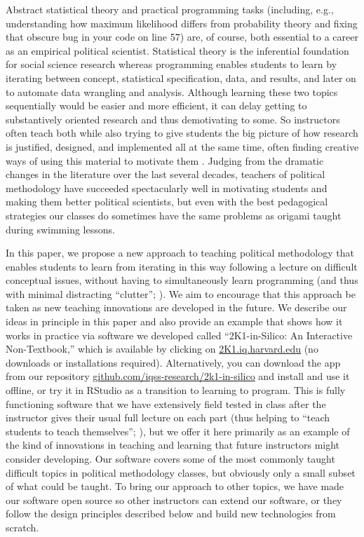 \documentclass[12pt]{article}
\theoremstyle{definition}
\begin{document}
Abstract statistical theory and practical programming tasks (including, e.g., understanding how maximum likelihood differs from probability theory and fixing that obscure bug in your code on line 57) are, of course, both essential to a career as an empirical political scientist. Statistical theory is the inferential foundation for social science research whereas programming enables students to learn by iterating between concept, statistical specification, data, and results, and later on to automate data wrangling and analysis. Although learning these two topics sequentially would be easier and more efficient, it can delay getting to substantively oriented research and thus demotivating to some. So instructors often teach both while also trying to give students the big picture of how research is justified, designed, and implemented all at the same time, often finding creative ways of using this material to motivate them \citep{williams2022teaching}. Judging from the dramatic changes in the literature over the last several decades, teachers of political methodology have succeeded spectacularly well in motivating students and making them better political scientists, but even with the best pedagogical strategies our classes do sometimes have the same problems as origami taught during swimming lessons.

In this paper, we propose a new approach to teaching political methodology that enables students to learn from iterating in this way following a lecture on difficult conceptual issues, without having to simultaneously learn programming (and thus with minimal distracting ``clutter''; \citealt{bailey2019teaching}). We aim to encourage that this approach be taken as new teaching innovations are developed in the future. We describe our ideas in principle in this paper and also provide an example that shows how it works in practice via software we developed called ``2K1-in-Silico: An Interactive Non-Textbook,'' which is available by clicking on \href{https://2k1.iq.harvard.edu}{2K1.iq.harvard.edu} (no downloads or installations required). Alternatively, you can download the app from our repository \href{https://github.com/iqss-research/2k1-in-silico}{github.com/iqss-research/2k1-in-silico} and install and use it offline, or try it in RStudio as a transition to learning to program. This is fully functioning software that we have extensively field tested in class after the instructor gives their usual full lecture on each part (thus helping to ``teach students to teach themselves''; \citealt{Schleutker2022}), but we offer it here primarily as an example of the kind of innovations in teaching and learning that future instructors might consider developing. Our software covers some of the most commonly taught difficult topics in political methodology classes, but obviously only a small subset of what could be taught. To bring our approach to other topics, we have made our software open source so other instructors can extend our software, or they follow the design principles described below and build new technologies from scratch.
\end{document}
